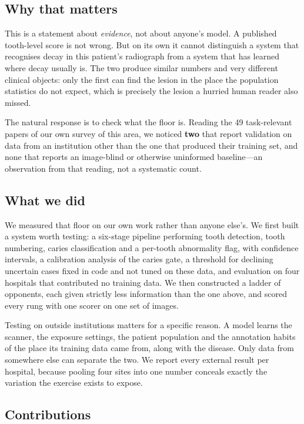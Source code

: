 \documentclass[conference]{IEEEtran}
\begin{document}
\subsection*{Why that matters}

This is a statement about \emph{evidence}, not about anyone's model. A published
tooth-level score is not wrong. But on its own it cannot distinguish a system
that recognises decay in this patient's radiograph from a system that has
learned where decay usually is. The two produce similar numbers and very
different clinical objects: only the first can find the lesion in the place the
population statistics do not expect, which is precisely the lesion a hurried
human reader also missed.

The natural response is to check what the floor is. Reading the 49 task-relevant
papers of our own survey of this area, we noticed \textbf{two} that report
validation on data from an institution other than the one that produced their
training set, and none that reports an image-blind or otherwise uninformed
baseline---an observation from that reading, not a systematic count.

\subsection*{What we did}

We measured that floor on our own work rather than anyone else's. We first built
a system worth testing: a six-stage pipeline performing tooth detection, tooth
numbering, caries classification and a per-tooth abnormality flag, with
confidence intervals, a calibration analysis of the caries gate, a threshold for
declining uncertain cases fixed in code and not tuned on these data, and evaluation on four
hospitals that contributed no training data. We then constructed a ladder of
opponents, each given strictly less information than the one above, and scored
every rung with one scorer on one set of images.

Testing on outside institutions matters for a specific reason. A model learns
the scanner, the exposure settings, the patient population and the annotation
habits of the place its training data came from, along with the disease. Only
data from somewhere else can separate the two. We report every external result
per hospital, because pooling four sites into one number conceals exactly the
variation the exercise exists to expose.

\subsection*{Contributions}
\end{document}
